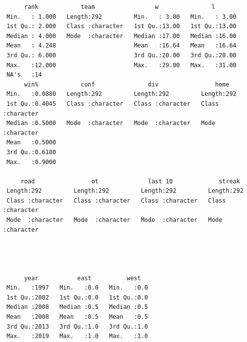 \documentclass[
  letterpaper,
  DIV=11,
  numbers=noendperiod]{scrartcl}
\begin{document}
\begin{verbatim}
      rank            team                 w               l        
 Min.   : 1.000   Length:292         Min.   : 3.00   Min.   : 3.00  
 1st Qu.: 2.000   Class :character   1st Qu.:13.00   1st Qu.:13.00  
 Median : 4.000   Mode  :character   Median :17.00   Median :16.00  
 Mean   : 4.248                      Mean   :16.64   Mean   :16.64  
 3rd Qu.: 6.000                      3rd Qu.:20.00   3rd Qu.:20.00  
 Max.   :12.000                      Max.   :29.00   Max.   :31.00  
 NA's   :14                                                         
      win%            conf               div                home          
 Min.   :0.0880   Length:292         Length:292         Length:292        
 1st Qu.:0.4045   Class :character   Class :character   Class :character  
 Median :0.5000   Mode  :character   Mode  :character   Mode  :character  
 Mean   :0.5000                                                           
 3rd Qu.:0.6180                                                           
 Max.   :0.9000                                                           
                                                                          
     road                ot              last 10             streak         
 Length:292         Length:292         Length:292         Length:292        
 Class :character   Class :character   Class :character   Class :character  
 Mode  :character   Mode  :character   Mode  :character   Mode  :character  
                                                                            
                                                                            
                                                                            
                                                                            
      year           east          west    
 Min.   :1997   Min.   :0.0   Min.   :0.0  
 1st Qu.:2002   1st Qu.:0.0   1st Qu.:0.0  
 Median :2008   Median :0.5   Median :0.5  
 Mean   :2008   Mean   :0.5   Mean   :0.5  
 3rd Qu.:2013   3rd Qu.:1.0   3rd Qu.:1.0  
 Max.   :2019   Max.   :1.0   Max.   :1.0  
                                           
\end{verbatim}
\end{document}

